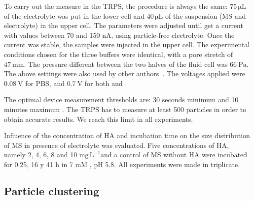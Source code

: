 \documentclass[journal=langd5,manuscript=article]{achemso}
\begin{document}
To carry out the measure in the TRPS, the procedure is always the same: $\mathrm{75 \,\mu L}$ of the electrolyte was put in the lower cell and $\mathrm{40 \,\mu L}$  of the suspension (MS and electrolyte) in the upper cell. The parameters were adjusted until get a current with values between 70 and 150 nA, using particle-free electrolyte. Once the current was stable, the samples were injected in the upper cell. The experimental conditions chosen for the three buffers  were identical, with a pore stretch of $47~\mathrm{mm}$. The pressure different between the two halves of the fluid cell was $66~\mathrm{Pa}$. The above settings were also used by other authors~\cite{Weatherall2016}. The voltages applied were  $0.08~\mathrm{V}$ for PBS, and  $0.7~\mathrm{V}$ for both  and . 
	



The optimal device measurement thresholds are: 30 seconds minimum and 10 minutes maximum . The TRPS has to measure at least 500 particles in order to obtain accurate results. We reach this limit in all experiments.
% 
% 



Influence of the concentration of HA and incubation time  on the size  distribution of MS in presence of  electrolyte was evaluated. Five concentrations of HA, namely 2, 4, 6, 8 and  10 $\mathrm{mg\,L^{-1}}$and a control of MS without HA
were incubated for 0.25, 16 y 41 h in 7 mM , pH  5.8.
All experiments were made in triplicate.








\subsection{Particle clustering}
\end{document}

